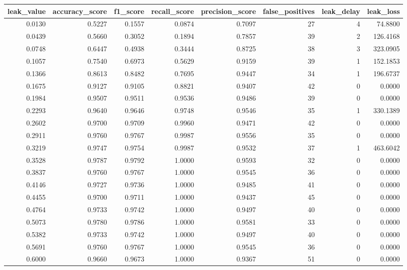 \begin{tabular}{rrrrrrrr}
\toprule
leak\_value & accuracy\_score & f1\_score & recall\_score & precision\_score & false\_positives & leak\_delay & leak\_loss \\
\midrule
0.0130 & 0.5227 & 0.1557 & 0.0874 & 0.7097 & 27 & 4 & 74.8800 \\
0.0439 & 0.5660 & 0.3052 & 0.1894 & 0.7857 & 39 & 2 & 126.4168 \\
0.0748 & 0.6447 & 0.4938 & 0.3444 & 0.8725 & 38 & 3 & 323.0905 \\
0.1057 & 0.7540 & 0.6973 & 0.5629 & 0.9159 & 39 & 1 & 152.1853 \\
0.1366 & 0.8613 & 0.8482 & 0.7695 & 0.9447 & 34 & 1 & 196.6737 \\
0.1675 & 0.9127 & 0.9105 & 0.8821 & 0.9407 & 42 & 0 & 0.0000 \\
0.1984 & 0.9507 & 0.9511 & 0.9536 & 0.9486 & 39 & 0 & 0.0000 \\
0.2293 & 0.9640 & 0.9646 & 0.9748 & 0.9546 & 35 & 1 & 330.1389 \\
0.2602 & 0.9700 & 0.9709 & 0.9960 & 0.9471 & 42 & 0 & 0.0000 \\
0.2911 & 0.9760 & 0.9767 & 0.9987 & 0.9556 & 35 & 0 & 0.0000 \\
0.3219 & 0.9747 & 0.9754 & 0.9987 & 0.9532 & 37 & 1 & 463.6042 \\
0.3528 & 0.9787 & 0.9792 & 1.0000 & 0.9593 & 32 & 0 & 0.0000 \\
0.3837 & 0.9760 & 0.9767 & 1.0000 & 0.9545 & 36 & 0 & 0.0000 \\
0.4146 & 0.9727 & 0.9736 & 1.0000 & 0.9485 & 41 & 0 & 0.0000 \\
0.4455 & 0.9700 & 0.9711 & 1.0000 & 0.9437 & 45 & 0 & 0.0000 \\
0.4764 & 0.9733 & 0.9742 & 1.0000 & 0.9497 & 40 & 0 & 0.0000 \\
0.5073 & 0.9780 & 0.9786 & 1.0000 & 0.9581 & 33 & 0 & 0.0000 \\
0.5382 & 0.9733 & 0.9742 & 1.0000 & 0.9497 & 40 & 0 & 0.0000 \\
0.5691 & 0.9760 & 0.9767 & 1.0000 & 0.9545 & 36 & 0 & 0.0000 \\
0.6000 & 0.9660 & 0.9673 & 1.0000 & 0.9367 & 51 & 0 & 0.0000 \\
\bottomrule
\end{tabular}
